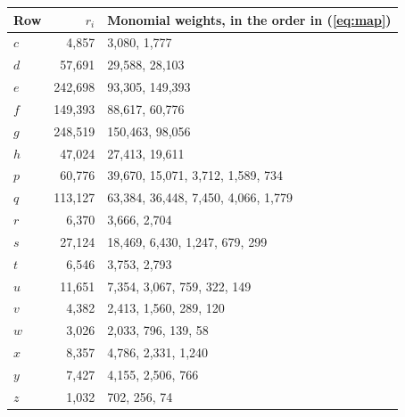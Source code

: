 \begin{tabular}{@{}lrl@{}}
\toprule
Row & $r_i$ & Monomial weights, in the order in (\ref{eq:map})\\
\midrule
$c$ & 4,857 & 3,080, 1,777\\
$d$ & 57,691 & 29,588, 28,103\\
$e$ & 242,698 & 93,305, 149,393\\
$f$ & 149,393 & 88,617, 60,776\\
$g$ & 248,519 & 150,463, 98,056\\
$h$ & 47,024 & 27,413, 19,611\\
$p$ & 60,776 & 39,670, 15,071, 3,712, 1,589, 734\\
$q$ & 113,127 & 63,384, 36,448, 7,450, 4,066, 1,779\\
$r$ & 6,370 & 3,666, 2,704\\
$s$ & 27,124 & 18,469, 6,430, 1,247, 679, 299\\
$t$ & 6,546 & 3,753, 2,793\\
$u$ & 11,651 & 7,354, 3,067, 759, 322, 149\\
$v$ & 4,382 & 2,413, 1,560, 289, 120\\
$w$ & 3,026 & 2,033, 796, 139, 58\\
$x$ & 8,357 & 4,786, 2,331, 1,240\\
$y$ & 7,427 & 4,155, 2,506, 766\\
$z$ & 1,032 & 702, 256, 74\\
\bottomrule
\end{tabular}
